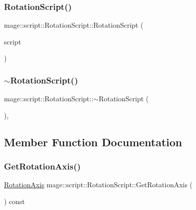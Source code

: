 \subsubsection{\texorpdfstring{Rotation\+Script()}{RotationScript()}\hspace{0.1cm}{\footnotesize\ttfamily [3/3]}}
{\footnotesize\ttfamily mage\+::script\+::\+Rotation\+Script\+::\+Rotation\+Script (\begin{DoxyParamCaption}\item[{\hyperlink{classmage_1_1script_1_1_rotation_script}{Rotation\+Script} \&\&}]{script }\end{DoxyParamCaption})\hspace{0.3cm}{\ttfamily [default]}}

\hypertarget{classmage_1_1script_1_1_rotation_script_a7deb74070c49b78b0b91e3599ee8a0b7}{}\label{classmage_1_1script_1_1_rotation_script_a7deb74070c49b78b0b91e3599ee8a0b7} 
\subsubsection{\texorpdfstring{$\sim$\+Rotation\+Script()}{~RotationScript()}}
{\footnotesize\ttfamily mage\+::script\+::\+Rotation\+Script\+::$\sim$\+Rotation\+Script (\begin{DoxyParamCaption}{ }\end{DoxyParamCaption})\hspace{0.3cm}{\ttfamily [virtual]}, {\ttfamily [default]}}



\subsection{Member Function Documentation}
\hypertarget{classmage_1_1script_1_1_rotation_script_ac2ef46249d59b379f47336eb250f3a28}{}\label{classmage_1_1script_1_1_rotation_script_ac2ef46249d59b379f47336eb250f3a28} 
\subsubsection{\texorpdfstring{Get\+Rotation\+Axis()}{GetRotationAxis()}}
{\footnotesize\ttfamily \hyperlink{classmage_1_1script_1_1_rotation_script_aa8a91cc8c771fc777ffb5e8a28c43ad2}{Rotation\+Axis} mage\+::script\+::\+Rotation\+Script\+::\+Get\+Rotation\+Axis (\begin{DoxyParamCaption}{ }\end{DoxyParamCaption}) const\hspace{0.3cm}{\ttfamily [noexcept]}}

